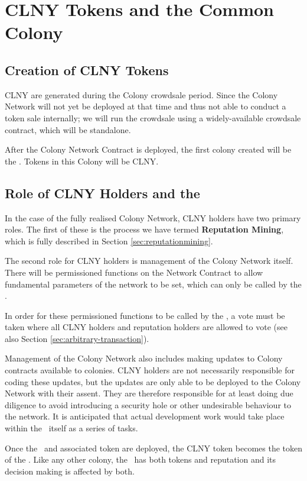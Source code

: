 \section{CLNY Tokens and the Common Colony}\label{sec:clny}

\subsection{Creation of CLNY Tokens}
CLNY are generated during the Colony crowdsale period. Since the Colony Network will not yet be deployed at that time and thus not able to conduct a token sale internally; we will run the crowdsale using a widely-available crowdsale contract, which will be standalone.

After the Colony Network Contract is deployed, the first colony created will be the \rc. Tokens in this Colony will be CLNY. 

\subsection{Role of CLNY Holders and the \rc}
In the case of the fully realised Colony Network, CLNY holders have two primary roles. The first of these is the process we have termed \textbf{Reputation Mining}, which is fully described in Section \ref{sec:reputationmining}.

The second role for CLNY holders is management of the Colony Network itself. There will be permissioned functions on the Network Contract to allow fundamental parameters of the network to be set, which can only be called by the \rc.

In order for these permissioned functions to be called by the \rc, a vote must be taken where all CLNY holders and reputation holders are allowed to vote (see also Section \ref{sec:arbitrary-transaction}).

Management of the Colony Network also includes making updates to Colony contracts available to colonies. CLNY holders are not necessarily responsible for coding these updates, but the updates are only able to be deployed to the Colony Network with their assent. They are therefore responsible for at least doing due diligence to avoid introducing a security hole or other undesirable behaviour to the network. It is anticipated that actual development work would take place within the \rc\ itself as a series of tasks.

Once the \rc\ and associated token are deployed, the CLNY token becomes the token of the \rc. Like any other colony, the \rc\ has both tokens and reputation and its decision making is affected by both.

